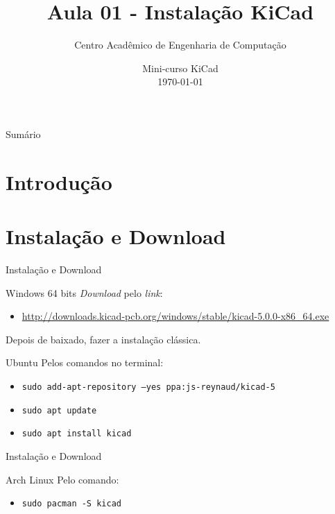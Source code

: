 \documentclass{beamer}
\title[Aula 01 - Instalação]{Aula 01 - Instalação KiCad}
\author[CAECP]{Centro Acadêmico de Engenharia de Computação}
\institute[UTFPR] 
{
  Departamento de Informática - DAINF \\
  Universidade Tecnológica Federal do Paraná
}
\date[\today]{Mini-curso KiCad\\\today}
\begin{document}
\begin{frame}
  \titlepage
\end{frame}

\begin{frame}{Sumário}
  \tableofcontents
\end{frame}

\section{Introdução}
\begin{frame}
		
\end{frame}

\section{Instalação e Download}
\begin{frame}{Instalação e Download}
	\begin{block}{Windows 64 bits}
		\textit{Download} pelo \textit{link}:
		\begin{itemize}
			\item \url{http://downloads.kicad-pcb.org/windows/stable/kicad-5.0.0-x86\_64.exe}
		\end{itemize}
		Depois de baixado, fazer a instalação clássica.
	\end{block}
	\begin{block}{Ubuntu}
		Pelos comandos no terminal:
		\begin{itemize}
			\item \texttt{sudo add-apt-repository --yes ppa:js-reynaud/kicad-5}
			\item \texttt{sudo apt update}
			\item \texttt{sudo apt install kicad}
		\end{itemize}
	\end{block}
\end{frame}

\begin{frame}{Instalação e Download}
	\begin{block}{Arch Linux}
		Pelo comando:
		\begin{itemize}
			\item \texttt{sudo pacman -S kicad}
		\end{itemize}
	\end{block}
\end{frame}
\end{document}
